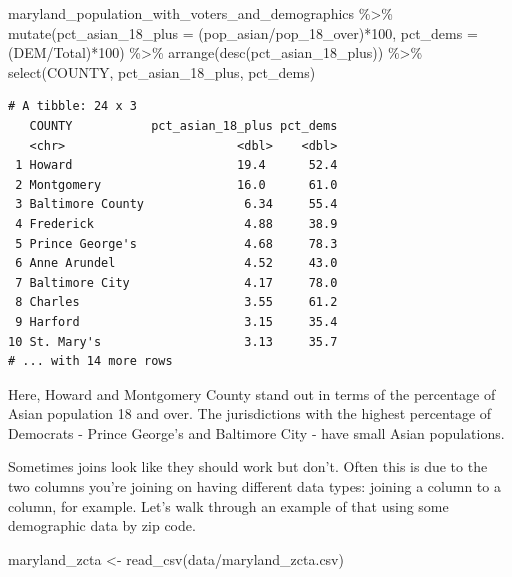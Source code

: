 \documentclass[
  letterpaper,
  DIV=11,
  numbers=noendperiod]{scrreprt}
\newenvironment{Shaded}{\begin{snugshade}}{\end{snugshade}}
\newcommand{\AttributeTok}[1]{\textcolor[rgb]{0.40,0.45,0.13}{#1}}
\newcommand{\DecValTok}[1]{\textcolor[rgb]{0.68,0.00,0.00}{#1}}
\newcommand{\FunctionTok}[1]{\textcolor[rgb]{0.28,0.35,0.67}{#1}}
\newcommand{\NormalTok}[1]{\textcolor[rgb]{0.00,0.23,0.31}{#1}}
\newcommand{\OtherTok}[1]{\textcolor[rgb]{0.00,0.23,0.31}{#1}}
\newcommand{\SpecialCharTok}[1]{\textcolor[rgb]{0.37,0.37,0.37}{#1}}
\newcommand{\StringTok}[1]{\textcolor[rgb]{0.13,0.47,0.30}{#1}}
\begin{document}
\begin{Shaded}
\begin{Highlighting}[]
\NormalTok{maryland\_population\_with\_voters\_and\_demographics }\SpecialCharTok{\%\textgreater{}\%}
  \FunctionTok{mutate}\NormalTok{(}\AttributeTok{pct\_asian\_18\_plus =}\NormalTok{ (pop\_asian}\SpecialCharTok{/}\NormalTok{pop\_18\_over)}\SpecialCharTok{*}\DecValTok{100}\NormalTok{, }\AttributeTok{pct\_dems =}\NormalTok{ (DEM}\SpecialCharTok{/}\NormalTok{Total)}\SpecialCharTok{*}\DecValTok{100}\NormalTok{) }\SpecialCharTok{\%\textgreater{}\%}
  \FunctionTok{arrange}\NormalTok{(}\FunctionTok{desc}\NormalTok{(pct\_asian\_18\_plus)) }\SpecialCharTok{\%\textgreater{}\%}
  \FunctionTok{select}\NormalTok{(COUNTY, pct\_asian\_18\_plus, pct\_dems)}
\end{Highlighting}
\end{Shaded}

\begin{verbatim}
# A tibble: 24 x 3
   COUNTY           pct_asian_18_plus pct_dems
   <chr>                        <dbl>    <dbl>
 1 Howard                       19.4      52.4
 2 Montgomery                   16.0      61.0
 3 Baltimore County              6.34     55.4
 4 Frederick                     4.88     38.9
 5 Prince George's               4.68     78.3
 6 Anne Arundel                  4.52     43.0
 7 Baltimore City                4.17     78.0
 8 Charles                       3.55     61.2
 9 Harford                       3.15     35.4
10 St. Mary's                    3.13     35.7
# ... with 14 more rows
\end{verbatim}

Here, Howard and Montgomery County stand out in terms of the percentage
of Asian population 18 and over. The jurisdictions with the highest
percentage of Democrats - Prince George's and Baltimore City - have
small Asian populations.

Sometimes joins look like they should work but don't. Often this is due
to the two columns you're joining on having different data types:
joining a column to a column, for example. Let's walk through an example
of that using some demographic data by zip code.

\begin{Shaded}
\begin{Highlighting}[]
\NormalTok{maryland\_zcta }\OtherTok{\textless{}{-}} \FunctionTok{read\_csv}\NormalTok{(}\StringTok{\textquotesingle{}data/maryland\_zcta.csv\textquotesingle{}}\NormalTok{)}
\end{Highlighting}
\end{Shaded}
\end{document}
